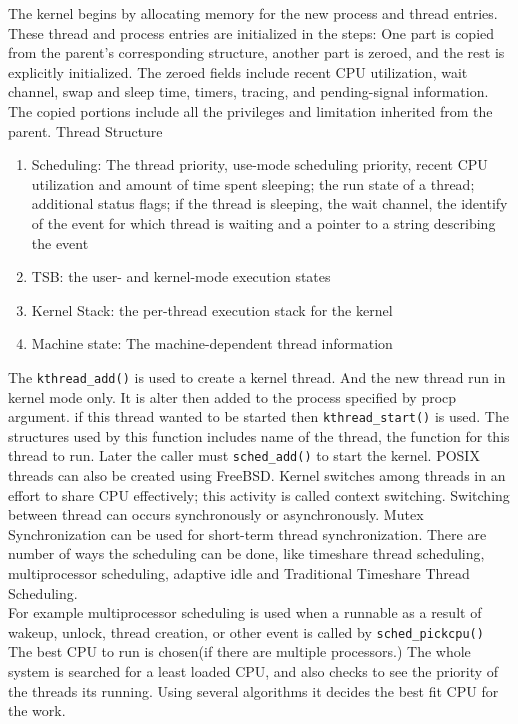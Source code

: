 \documentclass[letterpaper,10pt,draftclsnofoot,onecolumn]{IEEEtran}
\begin{document}
The kernel begins by allocating memory for the new process and thread entries. These thread and process entries are initialized in the steps: One part is copied from the parent's corresponding structure, another part is zeroed, and the rest is explicitly initialized. The zeroed fields include recent CPU utilization, wait channel, swap and sleep time, timers, tracing, and pending-signal information. The copied portions include all the privileges and limitation inherited from the parent.
Thread Structure
\begin{enumerate}
\item Scheduling: The thread priority, use-mode scheduling priority, recent CPU utilization and amount of time spent sleeping; the run state of a thread; additional status flags; if the thread is sleeping, the wait channel, the identify of the event for which thread is waiting and a pointer to a string describing the event
\item TSB: the user- and kernel-mode execution states
\item Kernel Stack: the per-thread execution stack for the kernel
\item Machine state: The machine-dependent thread information\cite{[2]} \\
\end{enumerate}
The \verb|kthread_add()| is used to create a kernel thread. And the new thread run in kernel mode only. It is alter then added to the process specified by procp argument. if this thread wanted to be started then \verb|kthread_start()| is used. The structures used by this function includes name of the thread, the function for this thread to run. Later the caller must \verb|sched_add()| to start the kernel. POSIX threads can also be created using FreeBSD.
Kernel switches among threads in an effort to share CPU effectively; this activity is called context switching. Switching between thread can occurs synchronously or asynchronously. Mutex Synchronization can be used for short-term thread synchronization.
There are number of ways the scheduling can be done, like timeshare thread scheduling, multiprocessor scheduling, adaptive idle and Traditional Timeshare Thread Scheduling.\\
For example multiprocessor scheduling is used when a runnable as a result of wakeup, unlock, thread creation, or other event is called by \verb|sched_pickcpu()| The best CPU to run is chosen(if there are multiple processors.) The whole system is searched for a least loaded CPU, and also checks to see the priority of the threads its running. Using several algorithms it decides the best fit CPU for the work.\cite{[2]}
\end{document}
